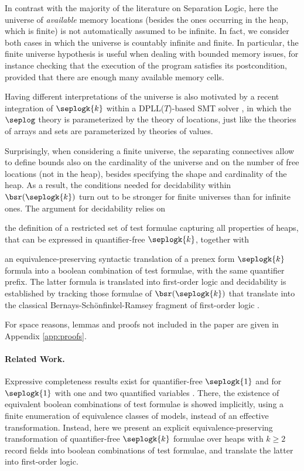 In contrast with the majority of the literature on Separation Logic,
here the universe of \emph{available} memory locations (besides the
ones occurring in the heap, which is finite) is not automatically
assumed to be infinite. In fact, we consider both cases in which the
universe is countably infinite and finite. In particular, the finite
universe hypothesis is useful when dealing with bounded memory issues,
for instance checking that the execution of the program satisfies its
postcondition, provided that there are enough many available memory
cells.

Having different interpretations of the universe is also motivated by
a recent integration of $\seplogk{k}$ within a DPLL($T$)-based SMT solver
\cite{ReynoldsIosifKingSerban16,Vmcai17}, in which the $\seplog$
theory is parameterized by the theory of locations, just like the
theories of arrays and sets are parameterized by theories of values.

Surprisingly, when considering a finite universe, the separating
connectives allow to define bounds also on the cardinality of the
universe and on the number of free locations (not in the heap),
besides specifying the shape and cardinality of the heap. As a
result, the conditions needed for decidability within
$\bsr(\seplogk{k})$ turn out to be stronger for finite universes than
for infinite ones. The argument for decidability relies
on \begin{inparaenum}[(i)]
\item the definition of a restricted set of test formulae capturing
  all properties of heaps, that can be expressed in quantifier-free
  $\seplogk{k}$, together with
%
\item an equivalence-preserving syntactic translation of a prenex form
  $\seplogk{k}$ formula into a boolean combination of test formulae,
  with the same quantifier prefix. The latter formula is translated
  into first-order logic and decidability is established by tracking
  those formulae of $\bsr(\seplogk{k})$ that translate into the
  classical Bernays-Sch\"onfinkel-Ramsey fragment of first-order logic
  \cite{Ramsey87}.
\end{inparaenum}

\ifLongVersion\else
For space reasons, lemmas and proofs not included in the paper are
given in Appendix \ref{app:proofs}.
\fi

\paragraph{Related Work.}
Expressive completeness results exist for quantifier-free
$\seplogk{1}$ \cite{PhD-lozes,BrocheninDemriLozes11} and for
$\seplogk{1}$ with one and two quantified variables
\cite{DemriGalmicheWendlingMery14,DemriDeters14}. There, the existence
of equivalent boolean combinations of test formulae is showed
implicitly, using a finite enumeration of equivalence classes of
models, instead of an effective transformation. Instead, here we
present an explicit equivalence-preserving transformation of
quantifier-free $\seplogk{k}$ formulae over heaps with $k\geq2$ record
fields into boolean combinations of test formulae, and translate the
latter into first-order logic.


